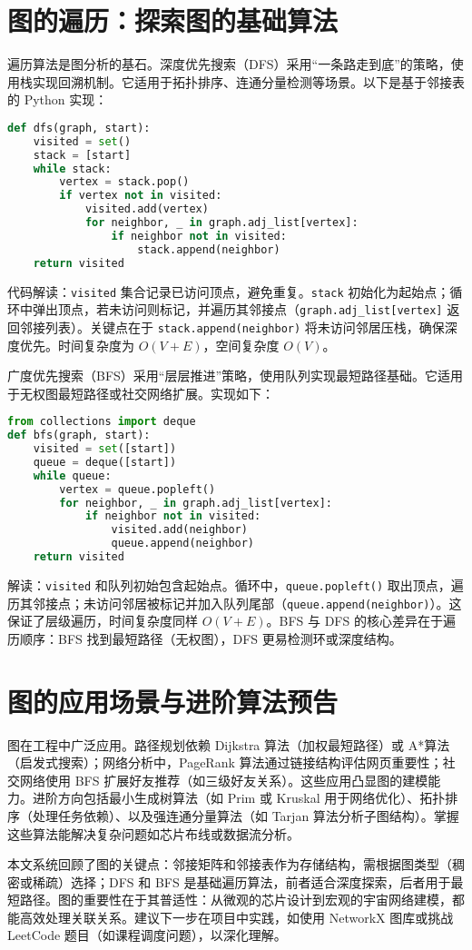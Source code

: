 \chapter{图的遍历：探索图的基础算法}
遍历算法是图分析的基石。深度优先搜索（DFS）采用“一条路走到底”的策略，使用栈实现回溯机制。它适用于拓扑排序、连通分量检测等场景。以下是基于邻接表的 Python 实现：\par
\begin{lstlisting}[language=python]
def dfs(graph, start):
    visited = set()
    stack = [start]
    while stack:
        vertex = stack.pop()
        if vertex not in visited:
            visited.add(vertex)
            for neighbor, _ in graph.adj_list[vertex]:
                if neighbor not in visited:
                    stack.append(neighbor)
    return visited
\end{lstlisting}
代码解读：\texttt{visited} 集合记录已访问顶点，避免重复。\texttt{stack} 初始化为起始点；循环中弹出顶点，若未访问则标记，并遍历其邻接点（\texttt{graph.adj\_{}list[vertex]} 返回邻接列表）。关键点在于 \texttt{stack.append(neighbor)} 将未访问邻居压栈，确保深度优先。时间复杂度为 $O(V + E)$，空间复杂度 $O(V)$。\par
广度优先搜索（BFS）采用“层层推进”策略，使用队列实现最短路径基础。它适用于无权图最短路径或社交网络扩展。实现如下：\par
\begin{lstlisting}[language=python]
from collections import deque
def bfs(graph, start):
    visited = set([start])
    queue = deque([start])
    while queue:
        vertex = queue.popleft()
        for neighbor, _ in graph.adj_list[vertex]:
            if neighbor not in visited:
                visited.add(neighbor)
                queue.append(neighbor)
    return visited
\end{lstlisting}
解读：\texttt{visited} 和队列初始包含起始点。循环中，\texttt{queue.popleft()} 取出顶点，遍历其邻接点；未访问邻居被标记并加入队列尾部（\texttt{queue.append(neighbor)}）。这保证了层级遍历，时间复杂度同样 $O(V + E)$。BFS 与 DFS 的核心差异在于遍历顺序：BFS 找到最短路径（无权图），DFS 更易检测环或深度结构。\par
\chapter{图的应用场景与进阶算法预告}
图在工程中广泛应用。路径规划依赖 Dijkstra 算法（加权最短路径）或 A*算法（启发式搜索）；网络分析中，PageRank 算法通过链接结构评估网页重要性；社交网络使用 BFS 扩展好友推荐（如三级好友关系）。这些应用凸显图的建模能力。进阶方向包括最小生成树算法（如 Prim 或 Kruskal 用于网络优化）、拓扑排序（处理任务依赖）、以及强连通分量算法（如 Tarjan 算法分析子图结构）。掌握这些算法能解决复杂问题如芯片布线或数据流分析。\par
本文系统回顾了图的关键点：邻接矩阵和邻接表作为存储结构，需根据图类型（稠密或稀疏）选择；DFS 和 BFS 是基础遍历算法，前者适合深度探索，后者用于最短路径。图的重要性在于其普适性：从微观的芯片设计到宏观的宇宙网络建模，都能高效处理关联关系。建议下一步在项目中实践，如使用 NetworkX 图库或挑战 LeetCode 题目（如课程调度问题），以深化理解。\par
